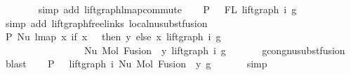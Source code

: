 \begin{isabellebody}
\ \ \ \ \ \ \isamarkupfalse%
\ {\isacharparenleft}{\kern0pt}simp\ add{\isacharcolon}{\kern0pt}\ lift{\isacharunderscore}{\kern0pt}graph{\isacharunderscore}{\kern0pt}lmap{\isacharunderscore}{\kern0pt}commute{\isacharparenright}{\kern0pt}\isanewline
\ \ \isamarkupfalse%
\ P{}{\isacharcolon}{\kern0pt}\ {\isachardoublequoteopen}{}\ {\isasymin}\ FL\ {\isacharparenleft}{\kern0pt}lift{\isacharunderscore}{\kern0pt}graph\ i\ g{\isacharparenright}{\kern0pt}{\isachardoublequoteclose}\isanewline
\ \ \ \ \ \isamarkupfalse%
\ {\isacharparenleft}{\kern0pt}simp\ add{\isacharcolon}{\kern0pt}\ lift{\isacharunderscore}{\kern0pt}graph{\isacharunderscore}{\kern0pt}freelinks\ local{\isachardot}{\kern0pt}nu{\isacharunderscore}{\kern0pt}subst{\isacharunderscore}{\kern0pt}fusion{}{\isacharparenright}{\kern0pt}\isanewline
\ \ \isamarkupfalse%
\ \isamarkupfalse%
\ P{}{\isacharcolon}{\kern0pt}\ {\isachardoublequoteopen}Nu\ {\isacharparenleft}{\kern0pt}lmap\ {\isacharparenleft}{\kern0pt}{\isasymlambda}x{\isachardot}{\kern0pt}\ if\ x\ {\isacharequal}{\kern0pt}\ {}\ then\ y\ else\ x{\isacharparenright}{\kern0pt}\ {\isacharparenleft}{\kern0pt}lift{\isacharunderscore}{\kern0pt}graph\ i\ g{\isacharparenright}{\kern0pt}{\isacharparenright}{\kern0pt}\ {\isasymsimeq}\isanewline
\ \ \ \ \ \ \ \ \ \ \ \ \ \ \ \ \ Nu\ {\isacharparenleft}{\kern0pt}Mol\ {\isacharparenleft}{\kern0pt}Fusion\ {}\ y{\isacharparenright}{\kern0pt}\ {\isacharparenleft}{\kern0pt}lift{\isacharunderscore}{\kern0pt}graph\ i\ g{\isacharparenright}{\kern0pt}{\isacharparenright}{\kern0pt}{\isachardoublequoteclose}\isanewline
\ \ \ \ \ \isamarkupfalse%
\ gcong{\isachardot}{\kern0pt}nu{\isacharunderscore}{\kern0pt}subst{\isacharunderscore}{\kern0pt}fusion{}\ \isamarkupfalse%
\ blast\isanewline
\ \ \isamarkupfalse%
\ P{}{\isacharcolon}{\kern0pt}\ {\isachardoublequoteopen}{\isachardot}{\kern0pt}{\isachardot}{\kern0pt}{\isachardot}{\kern0pt}\ {\isacharequal}{\kern0pt}\ lift{\isacharunderscore}{\kern0pt}graph\ i\ {\isacharparenleft}{\kern0pt}Nu\ {\isacharparenleft}{\kern0pt}Mol\ {\isacharparenleft}{\kern0pt}Fusion\ {}\ y{\isacharparenright}{\kern0pt}\ g{\isacharparenright}{\kern0pt}{\isacharparenright}{\kern0pt}{\isachardoublequoteclose}\isanewline
\ \ \ \ \ \isamarkupfalse%
\ simp\isanewline
\ \ \isamarkupfalse%
\ \isamarkupfalse%

\end{isabellebody}
